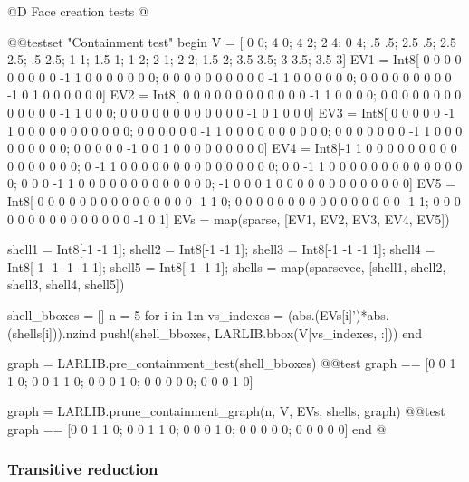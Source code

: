 @D Face creation tests
@{@@testset "Containment test" begin
    V = [  0   0;    4   0;    4   2;   2   4;  0 4;
          .5  .5;  2.5  .5;  2.5 2.5;  .5 2.5;
           1   1;  1.5   1;    1   2;
           2   1;    2   2;  1.5   2;
         3.5 3.5;    3 3.5;  3.5   3]
    EV1 = Int8[ 0  0  0  0  0  0  0  0  0 -1  1  0  0  0  0  0  0  0;
                0  0  0  0  0  0  0  0  0  0 -1  1  0  0  0  0  0  0;
                0  0  0  0  0  0  0  0  0 -1  0  1  0  0  0  0  0  0]
    EV2 = Int8[ 0  0  0  0  0  0  0  0  0  0  0  0 -1  1  0  0  0  0;
                0  0  0  0  0  0  0  0  0  0  0  0  0 -1  1  0  0  0;
                0  0  0  0  0  0  0  0  0  0  0  0 -1  0  1  0  0  0]
    EV3 = Int8[ 0  0  0  0  0 -1  1  0  0  0  0  0  0  0  0  0  0  0;
                0  0  0  0  0  0 -1  1  0  0  0  0  0  0  0  0  0  0;
                0  0  0  0  0  0  0 -1  1  0  0  0  0  0  0  0  0  0;
                0  0  0  0  0 -1  0  0  1  0  0  0  0  0  0  0  0  0]
    EV4 = Int8[-1  1  0  0  0  0  0  0  0  0  0  0  0  0  0  0  0  0;
                0 -1  1  0  0  0  0  0  0  0  0  0  0  0  0  0  0  0;
                0  0 -1  1  0  0  0  0  0  0  0  0  0  0  0  0  0  0;
                0  0  0 -1  1  0  0  0  0  0  0  0  0  0  0  0  0  0;
               -1  0  0  0  1  0  0  0  0  0  0  0  0  0  0  0  0  0]
    EV5 = Int8[ 0  0  0  0  0  0  0  0  0  0  0  0  0  0  0 -1  1  0;
                0  0  0  0  0  0  0  0  0  0  0  0  0  0  0  0 -1  1;
                0  0  0  0  0  0  0  0  0  0  0  0  0  0  0 -1  0  1]
    EVs = map(sparse, [EV1, EV2, EV3, EV4, EV5])
    
    shell1 = Int8[-1 -1  1];
    shell2 = Int8[-1 -1  1];
    shell3 = Int8[-1 -1 -1  1];
    shell4 = Int8[-1 -1 -1 -1  1];
    shell5 = Int8[-1 -1  1];
    shells = map(sparsevec, [shell1, shell2, shell3, shell4, shell5])
    
    shell_bboxes = []
    n = 5
    for i in 1:n
        vs_indexes = (abs.(EVs[i]')*abs.(shells[i])).nzind
        push!(shell_bboxes, LARLIB.bbox(V[vs_indexes, :]))
    end

    graph = LARLIB.pre_containment_test(shell_bboxes)
    @@test graph == [0 0 1 1 0; 0 0 1 1 0; 0 0 0 1 0; 0 0 0 0 0; 0 0 0 1 0]

    graph = LARLIB.prune_containment_graph(n, V, EVs, shells, graph)
    @@test graph == [0 0 1 1 0; 0 0 1 1 0; 0 0 0 1 0; 0 0 0 0 0; 0 0 0 0 0]
end
@}

\subsubsection{Transitive reduction}
\label{sec:transitivered_test}

